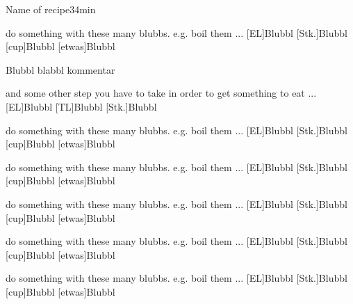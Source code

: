 \documentclass[ngerman,parskip=full]{article}
\begin{document}
\begin{recipe}{Name of recipe}{3}{4min}
  \begin{step}{do something with these many blubbs. e.g. boil them ...}
    [EL]{Blubbl}
    [Stk.]{Blubbl}
    [cup]{Blubbl}
    [etwas]{Blubbl}
  \end{step}
  Blubbl blabbl kommentar
  \begin{step}{and some other step you have to take in order to get
      something to eat ...}
    [EL]{Blubbl}
    [TL]{Blubbl}
    [Stk.]{Blubbl}
  \end{step}
  \begin{step}{do something with these many blubbs. e.g. boil them ...}
    [EL]{Blubbl}
    [Stk.]{Blubbl}
    [cup]{Blubbl}
    [etwas]{Blubbl}
  \end{step}
  \begin{step}{do something with these many blubbs. e.g. boil them ...}
    [EL]{Blubbl}
    [Stk.]{Blubbl}
    [cup]{Blubbl}
    [etwas]{Blubbl}
  \end{step}
  \begin{step}{do something with these many blubbs. e.g. boil them ...}
    [EL]{Blubbl}
    [Stk.]{Blubbl}
    [cup]{Blubbl}
    [etwas]{Blubbl}
  \end{step}
  \begin{step}{do something with these many blubbs. e.g. boil them ...}
    [EL]{Blubbl}
    [Stk.]{Blubbl}
    [cup]{Blubbl}
    [etwas]{Blubbl}
  \end{step}
  \begin{step}{do something with these many blubbs. e.g. boil them ...}
    [EL]{Blubbl}
    [Stk.]{Blubbl}
    [cup]{Blubbl}
    [etwas]{Blubbl}
  \end{step}

\end{recipe}
\end{document}
